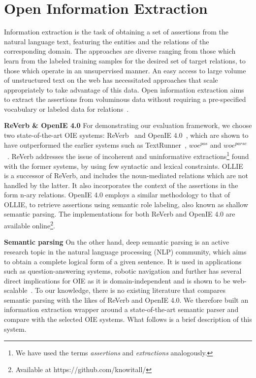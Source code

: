 \documentclass{llncs}
\begin{document}
\section{Open Information Extraction}
\label{sec:oie}
Information extraction is the task of obtaining a set of assertions from the natural language text, featuring the entities and the relations of the corresponding domain. The approaches are diverse ranging from those which learn from the labeled training samples for the desired set of target relations, to those which operate in an unsupervised manner. An easy access to large volume of unstructured text on the web has necessitated approaches that scale appropriately to take advantage of this data. Open information extraction aims to extract the assertions from voluminous data without requiring a pre-specified vocabulary or labeled data for relations~\cite{Etzioni2008a}.

\medskip
\noindent
\textbf{ReVerb \& OpenIE 4.0}
For demonstrating our evaluation framework, we choose two state-of-the-art OIE systems: ReVerb~\cite{Fader2011a} and OpenIE 4.0~\cite{Mausam2012a}, which are shown to have outperformed the earlier systems such as TextRunner~\cite{Etzioni2008a}, $woe^{pos}$ and $woe^{parse}$~\cite{Wu2010a}. ReVerb addresses the issue of incoherent and uninformative extractions\footnote{We have used the terms \textit{assertions} and \textit{extractions} analogously.} found with the former systems, by using few syntactic and lexical constraints. OLLIE~\cite{Mausam2012a} is a successor of ReVerb, and includes the noun-mediated relations which are not handled by the latter. It also incorporates the context of the assertions in the form n-ary relations. OpenIE 4.0 employs a similar methodology to that of OLLIE, to retrieve assertions using semantic role labeling, also known as shallow semantic parsing. The implementations for both ReVerb and OpenIE 4.0 are available online\footnote{Available at https://github.com/knowitall/}.

\medskip
\noindent
\textbf{Semantic parsing}
On the other hand, deep semantic parsing is an active research topic in the natural language processing (NLP) community, which aims to obtain a complete logical form of a given sentence. It is used in applications such as question-answering systems, robotic navigation and further has several direct implications for OIE as it is domain-independent and is shown to be web-scalable~\cite{Harrington2007}. To our knowledge, there is no existing literature that compares semantic parsing with the likes of ReVerb and OpenIE 4.0. We therefore built an information extraction wrapper around a state-of-the-art semantic parser and compare with the selected OIE systems. What follows is a brief description of this system.
\end{document}
